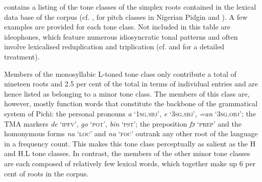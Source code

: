  contains a listing of the tone classes of the simplex roots contained in the lexical data base of the corpus (cf. \citealt{Faraclas1996,Good2004}, for pitch classes in Nigerian Pidgin and ). A few examples are provided for each tone class. Not included in this table are ideophones, which feature numerous idiosyncratic tonal patterns and often involve lexicalised reduplication and triplication (cf.  and  for a detailed treatment).

Members of the monosyllabic L-toned tone class only contribute a total of nineteen roots and 2.5 per cent of the total in terms of individual entries and are hence listed as belonging to a minor tone class. The members of this class are, however, mostly function words that constitute the backbone of the grammatical system of Pichi: the personal pronouns \textit{a} ‘\textsc{1sg.sbj}’, \textit{e} ‘\textsc{3sg.sbj}’, \textit{=an} ‘\textsc{3sg.obj}’; the \textsc{TMA} markers \textit{de} ‘\textsc{ipfv}’, \textit{go} ‘\textsc{pot}’, \textit{bin} ‘\textsc{pst}’; the preposition \textit{fɔ} ‘\textsc{prep}’ and the homonymous forms \textit{na} ‘\textsc{loc}’ and \textit{na} ‘\textsc{foc}’ outrank any other root of the language in a frequency count. This makes this tone class perceptually as salient as the H and H.L tone classes. In contrast, the members of the other minor tone classes are each  composed of relatively few lexical words, which together make up 6 per cent of roots in the corpus. 


